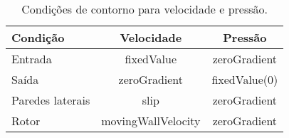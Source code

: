 \begin{table}[htb!]
\centering
\caption{Condições de contorno para velocidade e pressão.}
\label{tab:ccopenfoam}
\begin{tabular}{lcc}
\toprule

Condição         & Velocidade         & Pressão       \\ \midrule
Entrada          & fixedValue         & zeroGradient  \\
Saída            & zeroGradient       & fixedValue(0) \\
Paredes laterais & slip               & zeroGradient  \\
Rotor            & movingWallVelocity & zeroGradient  \\ \bottomrule
\end{tabular}
\end{table}